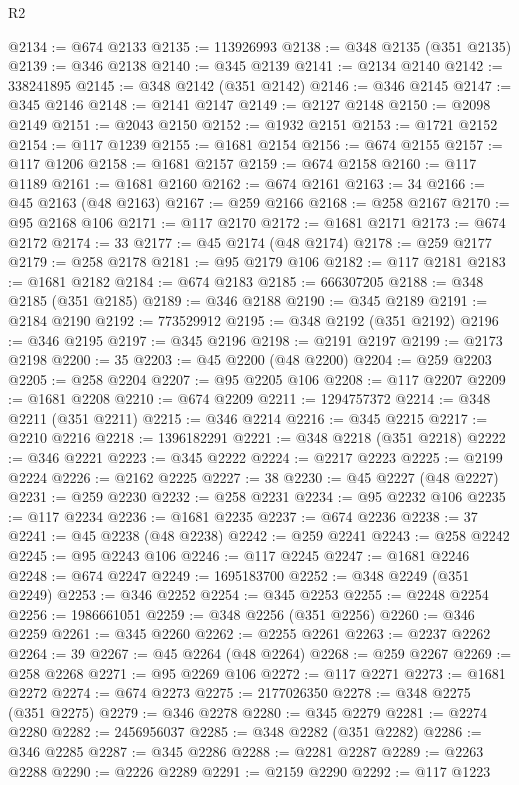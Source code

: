 \begin{lexlean}{R2}
\begin{coremodule}
@2134 := @674 @2133
@2135 := 113926993
@2138 := @348 @2135 (@351 @2135)
@2139 := @346 @2138
@2140 := @345 @2139
@2141 := @2134 @2140
@2142 := 338241895
@2145 := @348 @2142 (@351 @2142)
@2146 := @346 @2145
@2147 := @345 @2146
@2148 := @2141 @2147
@2149 := @2127 @2148
@2150 := @2098 @2149
@2151 := @2043 @2150
@2152 := @1932 @2151
@2153 := @1721 @2152
@2154 := @117 @1239
@2155 := @1681 @2154
@2156 := @674 @2155
@2157 := @117 @1206
@2158 := @1681 @2157
@2159 := @674 @2158
@2160 := @117 @1189
@2161 := @1681 @2160
@2162 := @674 @2161
@2163 := 34
@2166 := @45 @2163 (@48 @2163)
@2167 := @259 @2166
@2168 := @258 @2167
@2170 := @95 @2168 @106
@2171 := @117 @2170
@2172 := @1681 @2171
@2173 := @674 @2172
@2174 := 33
@2177 := @45 @2174 (@48 @2174)
@2178 := @259 @2177
@2179 := @258 @2178
@2181 := @95 @2179 @106
@2182 := @117 @2181
@2183 := @1681 @2182
@2184 := @674 @2183
@2185 := 666307205
@2188 := @348 @2185 (@351 @2185)
@2189 := @346 @2188
@2190 := @345 @2189
@2191 := @2184 @2190
@2192 := 773529912
@2195 := @348 @2192 (@351 @2192)
@2196 := @346 @2195
@2197 := @345 @2196
@2198 := @2191 @2197
@2199 := @2173 @2198
@2200 := 35
@2203 := @45 @2200 (@48 @2200)
@2204 := @259 @2203
@2205 := @258 @2204
@2207 := @95 @2205 @106
@2208 := @117 @2207
@2209 := @1681 @2208
@2210 := @674 @2209
@2211 := 1294757372
@2214 := @348 @2211 (@351 @2211)
@2215 := @346 @2214
@2216 := @345 @2215
@2217 := @2210 @2216
@2218 := 1396182291
@2221 := @348 @2218 (@351 @2218)
@2222 := @346 @2221
@2223 := @345 @2222
@2224 := @2217 @2223
@2225 := @2199 @2224
@2226 := @2162 @2225
@2227 := 38
@2230 := @45 @2227 (@48 @2227)
@2231 := @259 @2230
@2232 := @258 @2231
@2234 := @95 @2232 @106
@2235 := @117 @2234
@2236 := @1681 @2235
@2237 := @674 @2236
@2238 := 37
@2241 := @45 @2238 (@48 @2238)
@2242 := @259 @2241
@2243 := @258 @2242
@2245 := @95 @2243 @106
@2246 := @117 @2245
@2247 := @1681 @2246
@2248 := @674 @2247
@2249 := 1695183700
@2252 := @348 @2249 (@351 @2249)
@2253 := @346 @2252
@2254 := @345 @2253
@2255 := @2248 @2254
@2256 := 1986661051
@2259 := @348 @2256 (@351 @2256)
@2260 := @346 @2259
@2261 := @345 @2260
@2262 := @2255 @2261
@2263 := @2237 @2262
@2264 := 39
@2267 := @45 @2264 (@48 @2264)
@2268 := @259 @2267
@2269 := @258 @2268
@2271 := @95 @2269 @106
@2272 := @117 @2271
@2273 := @1681 @2272
@2274 := @674 @2273
@2275 := 2177026350
@2278 := @348 @2275 (@351 @2275)
@2279 := @346 @2278
@2280 := @345 @2279
@2281 := @2274 @2280
@2282 := 2456956037
@2285 := @348 @2282 (@351 @2282)
@2286 := @346 @2285
@2287 := @345 @2286
@2288 := @2281 @2287
@2289 := @2263 @2288
@2290 := @2226 @2289
@2291 := @2159 @2290
@2292 := @117 @1223

\end{coremodule}
\end{lexlean}
